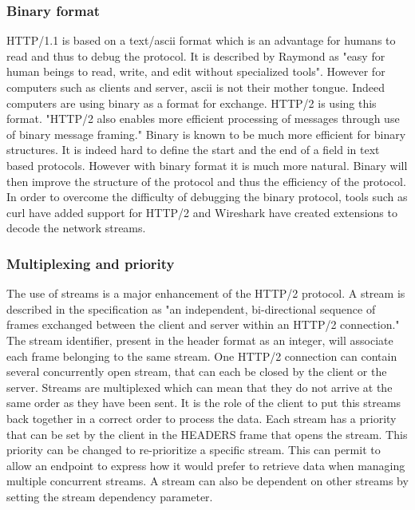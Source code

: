 \subsubsection{Binary format}
HTTP/1.1 is based on a text/ascii format which is an advantage for humans to read and thus to debug the protocol. It is described by Raymond as "easy for human beings to read, write, and edit without specialized tools"\cite{raymond}. However for computers such as clients and server, ascii is not their mother tongue. Indeed computers are using binary as a format for exchange. HTTP/2 is using this format.
"HTTP/2 also enables more efficient processing of messages through use of binary message framing."\cite{http2} Binary is known to be much more efficient for binary structures. It is indeed hard to define the start and the end of a field in text based protocols. However with binary format it is much more natural. Binary will then improve the structure of the protocol and thus the efficiency of the protocol. In order to overcome the difficulty of debugging the binary protocol, tools such as curl\cite{curlhttp2} have added support for HTTP/2 and Wireshark have created extensions\cite{wiresharkhttp2} to decode the network streams.

\subsubsection{Multiplexing and priority}
The use of streams is a major enhancement of the HTTP/2 protocol. A stream is described in the specification as "an independent, bi-directional sequence of frames exchanged between the client and server within an HTTP/2 connection."\cite{http2} The stream identifier, present in the header format as an integer, will associate each frame belonging to the same stream. One HTTP/2 connection can contain several concurrently open stream, that can each be closed by the client or the server. Streams are multiplexed which can mean that they do not arrive at the same order as they have been sent. It is the role of the client to put this streams back together in a correct order to process the data. 
Each stream has a priority that can be set by the client in the HEADERS frame that opens the stream. This priority can be changed to re-prioritize a specific stream. This can permit to allow an endpoint to express how it would prefer to retrieve data when managing multiple concurrent streams. A stream can also be dependent on other streams by setting the stream dependency parameter.

